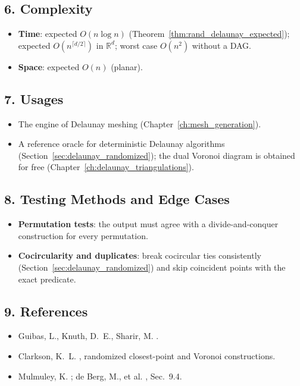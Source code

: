 \subsection{6. Complexity}

\begin{itemize}
\item \textbf{Time}: expected $O(n \log n)$ (Theorem~\ref{thm:rand_delaunay_expected});
  expected $O(n^{\lceil d/2 \rceil})$ in $\mathbb{R}^d$; worst case $O(n^2)$
  without a DAG.
\item \textbf{Space}: expected $O(n)$ (planar).
\end{itemize}

\subsection{7. Usages}

\begin{itemize}
\item The engine of Delaunay meshing (Chapter~\ref{ch:mesh_generation}).
\item A reference oracle for deterministic Delaunay algorithms
  (Section~\ref{sec:delaunay_randomized}); the dual Voronoi diagram is obtained
  for free (Chapter~\ref{ch:delaunay_triangulations}).
\end{itemize}

\subsection{8. Testing Methods and Edge Cases}

\begin{itemize}
\item \textbf{Permutation tests}: the output must agree with a divide-and-conquer
  construction for every permutation.
\item \textbf{Cocircularity and duplicates}: break cocircular ties consistently
  (Section~\ref{sec:delaunay_randomized}) and skip coincident points with the
  exact predicate.
\end{itemize}

\subsection{9. References}

\begin{itemize}
\item Guibas, L., Knuth, D.~E., Sharir, M. \cite{guibas1992}.
\item Clarkson, K.~L. \cite{clarkson1993}, randomized closest-point and Voronoi
  constructions.
\item Mulmuley, K. \cite{mulmuley1990}; de Berg, M., et al. \cite{deberg2008},
  Sec.~9.4.
\end{itemize}

